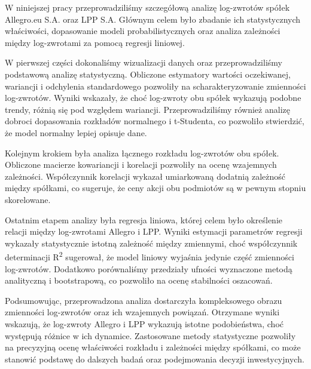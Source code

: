 \documentclass[12pt]{article}
\begin{document}
W niniejszej pracy przeprowadziliśmy szczegółową analizę log-zwrotów spółek Allegro.eu S.A. oraz LPP S.A. Głównym celem było zbadanie ich statystycznych właściwości, dopasowanie modeli probabilistycznych oraz analiza zależności między log-zwrotami za pomocą regresji liniowej.

W pierwszej części dokonaliśmy wizualizacji danych oraz przeprowadziliśmy podstawową analizę statystyczną. Obliczone estymatory wartości oczekiwanej, wariancji i odchylenia standardowego pozwoliły na scharakteryzowanie zmienności log-zwrotów. Wyniki wskazały, że choć log-zwroty obu spółek wykazują podobne trendy, różnią się pod względem wariancji. Przeprowadziliśmy również analizę dobroci dopasowania rozkładów normalnego i t-Studenta, co pozwoliło stwierdzić, że model normalny lepiej opisuje dane.

Kolejnym krokiem była analiza łącznego rozkładu log-zwrotów obu spółek. Obliczone macierze kowariancji i korelacji pozwoliły na ocenę wzajemnych zależności. Współczynnik korelacji wykazał umiarkowaną dodatnią zależność między spółkami, co sugeruje, że ceny akcji obu podmiotów są w pewnym stopniu skorelowane.

Ostatnim etapem analizy była regresja liniowa, której celem było określenie relacji między log-zwrotami Allegro i LPP. Wyniki estymacji parametrów regresji wykazały statystycznie istotną zależność między zmiennymi, choć współczynnik determinacji R\textsuperscript{2} sugerował, że model liniowy wyjaśnia jedynie część zmienności log-zwrotów. Dodatkowo porównaliśmy przedziały ufności wyznaczone metodą analityczną i bootstrapową, co pozwoliło na ocenę stabilności oszacowań.

Podsumowując, przeprowadzona analiza dostarczyła kompleksowego obrazu zmienności log-zwrotów oraz ich wzajemnych powiązań. Otrzymane wyniki wskazują, że log-zwroty Allegro i LPP wykazują istotne podobieństwa, choć występują różnice w ich dynamice. Zastosowane metody statystyczne pozwoliły na precyzyjną ocenę właściwości rozkładu i zależności między spółkami, co może stanowić podstawę do dalszych badań oraz podejmowania decyzji inwestycyjnych.
\end{document}

